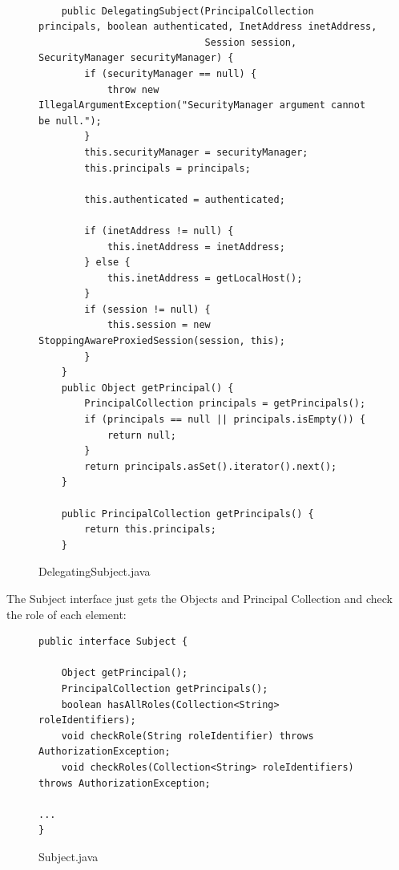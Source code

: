 \begin{figure}[!tbp]
\centering
\lstset{language=Java, stepnumber=1, showspaces=false, showstringspaces=false,breaklines=true}
\begin{lstlisting}

    public DelegatingSubject(PrincipalCollection principals, boolean authenticated, InetAddress inetAddress,
                             Session session, SecurityManager securityManager) {
        if (securityManager == null) {
            throw new IllegalArgumentException("SecurityManager argument cannot be null.");
        }
        this.securityManager = securityManager;
        this.principals = principals;

        this.authenticated = authenticated;

        if (inetAddress != null) {
            this.inetAddress = inetAddress;
        } else {
            this.inetAddress = getLocalHost();
        }
        if (session != null) {
            this.session = new StoppingAwareProxiedSession(session, this);
        }
    }
    public Object getPrincipal() {
        PrincipalCollection principals = getPrincipals();
        if (principals == null || principals.isEmpty()) {
            return null;
        }
        return principals.asSet().iterator().next();
    }

    public PrincipalCollection getPrincipals() {
        return this.principals;
    }

\end{lstlisting}
\caption{DelegatingSubject.java}
\label{DelegatingSubject}
\end{figure}

The Subject interface just gets the Objects and Principal Collection and check the role of each element:

\begin{figure}[!tbp]
\centering
\lstset{language=Java, stepnumber=1, showspaces=false, showstringspaces=false,breaklines=true}
\begin{lstlisting}
public interface Subject {

    Object getPrincipal();
    PrincipalCollection getPrincipals();
    boolean hasAllRoles(Collection<String> roleIdentifiers);
    void checkRole(String roleIdentifier) throws AuthorizationException;
    void checkRoles(Collection<String> roleIdentifiers) throws AuthorizationException;

...
}
\end{lstlisting}
\caption{Subject.java}
\label{Subject}
\end{figure}
